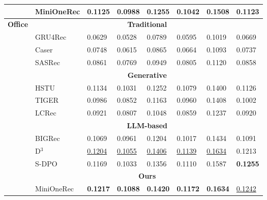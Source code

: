 \begin{table}[t]
{\begin{tabular}{clllllll}
                                      & MiniOneRec      & \textbf{0.1125} & \textbf{0.0988} & \textbf{0.1255} & \textbf{0.1042} & \textbf{0.1508} & \textbf{0.1123}  \\
                                      \hline
\multirow{14}{*}{\textbf{Office}}     & \multicolumn{7}{c}{\textbf{Traditional}}                          \\ \cline{2-8} 
                                      & GRU4Rec    & 0.0629 & 0.0528 & 0.0789 & 0.0595 & 0.1019 & 0.0669  \\
                                      & Caser      & 0.0748 & 0.0615 & 0.0865 & 0.0664 & 0.1093 & 0.0737  \\
                                      & SASRec     & 0.0861 & 0.0769 & 0.0949 & 0.0805 & 0.1120 & 0.0858  \\ \cline{2-8} 
                                      & \multicolumn{7}{c}{\textbf{Generative}}                           \\ \cline{2-8} 
                                      & HSTU       & 0.1134 & 0.1031 & 0.1252 & 0.1079 & 0.1400 & 0.1126  \\
                                      & TIGER      & 0.0986 & 0.0852 & 0.1163 & 0.0960 & 0.1408 & 0.1002  \\
                                      & LCRec      & 0.0921 & 0.0807 &    0.1048 & 0.0859 & 0.1237 & 0.0920  \\ \cline{2-8} 
                                      & \multicolumn{7}{c}{\textbf{LLM-based}}                            \\ \cline{2-8} 
                                      & BIGRec     & 0.1069 & 0.0961 & 0.1204 & 0.1017 & 0.1434 & 0.1091  \\
                                      & D$^{3}$         & \uline{0.1204} & \uline{0.1055} & \uline{0.1406} & \uline{0.1139} & \uline{0.1634} & 0.1213  \\
                                      & S-DPO      & 0.1169 & 0.1033 & 0.1356 & 0.1110 & 0.1587 & \textbf{0.1255}  \\ \cline{2-8} 
                                      & \multicolumn{7}{c}{\textbf{Ours}}                                 \\ \cline{2-8} 
                                      & MiniOneRec      & \textbf{0.1217} & \textbf{0.1088} & \textbf{0.1420} & \textbf{0.1172} & \textbf{0.1634} & \uline{0.1242}  \\
                                      \hline
\end{tabular}
}
\end{table}

